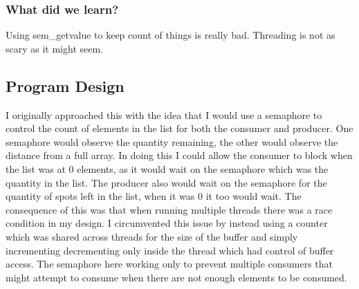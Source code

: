 \documentclass[letterpaper,10pt,notitlepage,fleqn]{article}
\begin{document}
\subsubsection{What did we learn?}
Using sem\_getvalue to keep count of things is really bad. Threading is not as scary as it might seem.

\subsection{Program Design}
I originally approached this with the idea that I would use a semaphore to control the count of elements in the list for both the consumer and producer. One semaphore would observe the quantity remaining, the other would observe the distance from a full array. In doing this I could allow the consumer to block when the list was at 0 elements, as it would wait on the semaphore which was the quantity in the list. The producer also would wait on the semaphore for the quantity of spots left in the list, when it was 0 it too would wait. The consequence of this was that when running multiple threads there was a race condition in my design. I circumvented this issue by instead using a counter which was shared across threads for the size of the buffer and simply incrementing decrementing only inside the thread which had control of buffer access. The semaphore here working only to prevent multiple consumers that might attempt to consume when there are not enough elements to be consumed.


%
\end{document}
